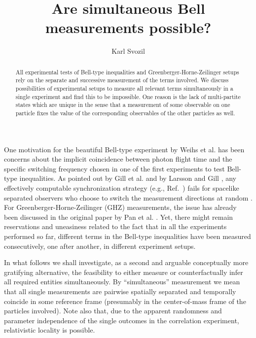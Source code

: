 \documentclass[pra,amsfonts,showpacs,preprint,showkeys]{revtex4}
\begin{document}



\title{Are simultaneous Bell measurements possible?}

\author{Karl Svozil}


\begin{abstract}
All experimental tests of Bell-type inequalities and Greenberger-Horne-Zeilinger setups rely on the separate and successive measurement of the terms involved.
We discuss possibilities of experimental setups to measure all relevant terms simultaneously in a single experiment and find this to be impossible.
One reason is the lack of multi-partite states which are unique in the sense that a measurement of some observable on one particle fixes the value of the corresponding observables of the other particles as well.
\end{abstract}


\maketitle
One  motivation for the beautiful Bell-type
experiment by Weihs et al. \cite{wjswz-98}
has been concerns \cite{zeilinger-86} about the implicit coincidence
between photon flight time and the specific switching frequency chosen
in one of the first experiments \cite{aspect-82b} to test Bell-type inequalities.
As pointed out by Gill et al.
\cite{Gill-Weihs-Z-Z,Gill-Weihs-Z-Z-II,gill-03}
and by Larsson and Gill  \cite{Gill-Larss-04},
any effectively computable synchronization strategy
(e.g., Ref.~\cite{pabh-04})
fails for spacelike separated observers who choose to switch the measurement directions
at random \cite{calude:94,svozil-qct}.
For Greenberger-Horne-Zeilinger (GHZ) measurements, the issue has already been discussed in the
original paper by Pan et al. \cite{panbdwz}.
Yet, there might remain reservations and uneasiness related to the fact
that in all
the experiments performed so far, different terms
in the Bell-type inequalities have been measured consecutively,
one after another, in different experiment setups.


In what follows we shall investigate, as a second and arguable conceptually more
gratifying alternative, the feasibility to either measure
or counterfactually infer
all required entities  simultaneously.
By ``simultaneous'' measurement we mean that all single measurements
are pairwise spatially separated and temporally coincide in some reference frame
(presumably in the center-of-mass frame of the particles involved).
Note also that, due to the apparent randomness and parameter independence
of the single outcomes in the correlation experiment,
relativistic locality is possible.
\end{document}
